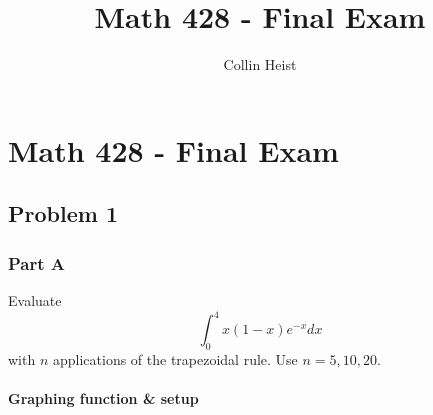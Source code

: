 \documentclass[11pt]{article}
\author{Collin Heist}
\title{Math 428 - Final Exam}
\begin{document}
    
    
    \maketitle
    
    

    
    \hypertarget{math-428---final-exam}{%
\section{Math 428 - Final Exam}\label{math-428---final-exam}}

\hypertarget{problem-1}{%
\subsection{Problem 1}\label{problem-1}}

\hypertarget{part-a}{%
\subsubsection{Part A}\label{part-a}}

Evaluate \[\int_{0}^{4}x(1-x)e^{-x}dx\] with \(n\) applications of the
trapezoidal rule. Use \(n=5, 10, 20\).

\hypertarget{graphing-function-setup}{%
\paragraph{Graphing function \& setup}\label{graphing-function-setup}}
\end{document}
